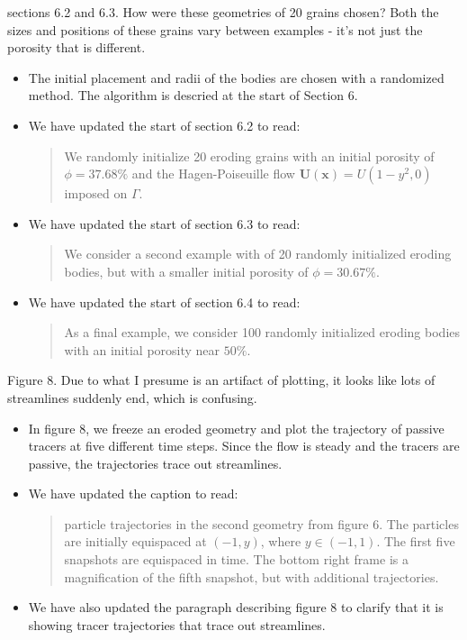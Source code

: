 \documentclass[11pt]{article}
\newcommand{\comment}[1]{{\color{blue} #1}}
\begin{document}
\noindent
\comment{sections 6.2 and 6.3.  How were these geometries of 20 grains
chosen?  Both the sizes and positions of these grains vary between
examples - it's not just the porosity that is different.}
\begin{itemize}
  \item The initial placement and radii of the bodies are chosen with a
    randomized method. The algorithm is descried at the start of Section
    6.

  \item We have updated the start of section 6.2 to read:
    \begin{quotation}
      \noindent
      We randomly initialize 20 eroding grains with an initial porosity
      of $\phi = 37.68\%$ and the Hagen-Poiseuille flow
      $\mathbf{U}(\mathbf{x}) = U (1-y^2, 0)$ imposed on $\Gamma$.
    \end{quotation}


  \item We have updated the start of section 6.3 to read:
    \begin{quotation}
      \noindent
      We consider a second example with of 20 randomly initialized
      eroding bodies, but with a smaller initial porosity of $\phi =
      30.67\%$.
    \end{quotation}


  \item We have updated the start of section 6.4 to read:
    \begin{quotation}
      \noindent
        As a final example, we consider 100 randomly initialized eroding
        bodies with an initial porosity near $50\%$.
    \end{quotation}

\end{itemize}




\noindent
\comment{Figure 8.  Due to what I presume is an artifact of plotting, it
looks like lots of streamlines suddenly end, which is confusing.}
\begin{itemize}
  \item In figure 8, we freeze an eroded geometry and plot the
    trajectory of passive tracers at five different time steps. Since
    the flow is steady and the tracers are passive, the trajectories
    trace out streamlines.

  \item We have updated the caption to read:
    \begin{quotation}
       particle trajectories in the second geometry from figure 6.
      The particles are initially equispaced at $(−1,y)$, where $y \in
      (-1, 1)$. The first five snapshots are equispaced in time. The
      bottom right frame is a magnification of the fifth snapshot, but
      with additional trajectories.
    \end{quotation}

  \item We have also updated the paragraph describing figure 8 to
    clarify that it is showing tracer trajectories that trace out
    streamlines.
\end{itemize}
\end{document}
